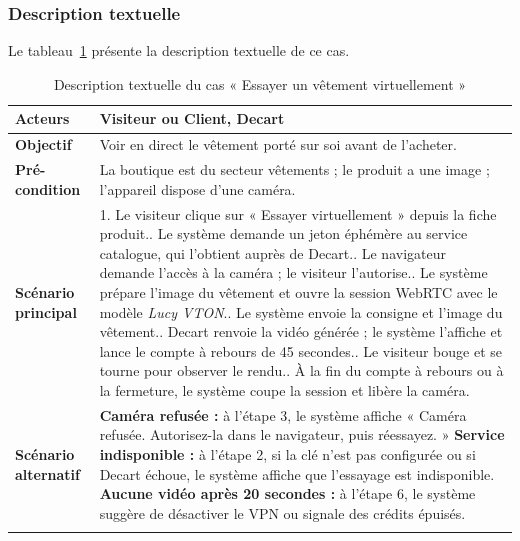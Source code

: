 \subsubsection{Description textuelle}
Le tableau~\ref{tab:uc-tryon} présente la description textuelle de ce cas.
\renewcommand{\arraystretch}{1.5}
\begin{longtable}{|p{4cm}|p{11cm}|}
\hline
\textbf{Acteurs} & Visiteur ou Client, Decart \\
\hline
\textbf{Objectif} & Voir en direct le vêtement porté sur soi avant de l'acheter. \\
\hline
\textbf{Pré-condition} & La boutique est du secteur vêtements ; le produit a une image ; l'appareil dispose d'une caméra. \\
\hline
\textbf{Scénario principal} &
1. Le visiteur clique sur « Essayer virtuellement » depuis la fiche produit.\newline
2. Le système demande un jeton éphémère au service catalogue, qui l'obtient auprès de Decart.\newline
3. Le navigateur demande l'accès à la caméra ; le visiteur l'autorise.\newline
4. Le système prépare l'image du vêtement et ouvre la session WebRTC avec le modèle \textit{Lucy VTON}.\newline
5. Le système envoie la consigne et l'image du vêtement.\newline
6. Decart renvoie la vidéo générée ; le système l'affiche et lance le compte à rebours de 45 secondes.\newline
7. Le visiteur bouge et se tourne pour observer le rendu.\newline
8. À la fin du compte à rebours ou à la fermeture, le système coupe la session et libère la caméra. \\
\hline
\textbf{Scénario alternatif} &
\textbf{Caméra refusée :} à l'étape 3, le système affiche « Caméra refusée. Autorisez-la dans le navigateur, puis réessayez. »\newline
\textbf{Service indisponible :} à l'étape 2, si la clé n'est pas configurée ou si Decart échoue, le système affiche que l'essayage est indisponible.\newline
\textbf{Aucune vidéo après 20 secondes :} à l'étape 6, le système suggère de désactiver le VPN ou signale des crédits épuisés. \\
\hline
\caption{Description textuelle du cas « Essayer un vêtement virtuellement »}
\label{tab:uc-tryon}
\end{longtable}

